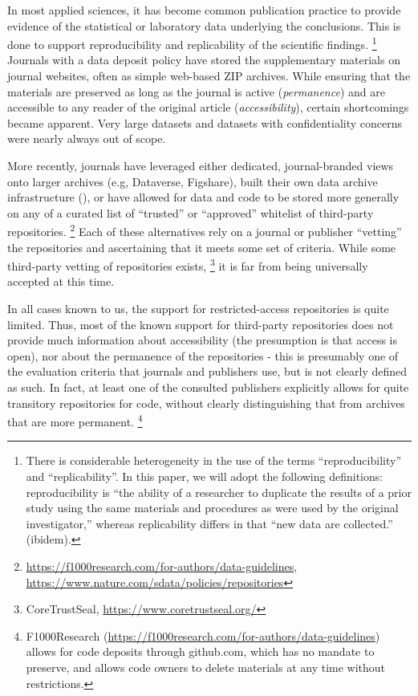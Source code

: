 In most applied sciences,
it has become common publication practice to provide evidence of the
statistical or laboratory data underlying the conclusions. This is done
to support reproducibility and replicability of the scientific
findings.%
\footnote{There is considerable heterogeneity in the use of the terms
	``reproducibility'' and ``replicability''. In this paper, we will adopt
	the following definitions: reproducibility is ``the ability of a
	researcher to duplicate the results of a prior study using the same
	materials and procedures as were used by the original investigator,''
	\parencite{BollenSocialBehavioralEconomic2015} whereas replicability
	differs in that ``new data are collected.'' (ibidem).} 
Journals with a
data deposit policy have stored the supplementary materials on journal
websites, often as simple web-based ZIP archives. While ensuring that
the materials are preserved as long as the journal is active
(\textit{permanence}) and are accessible to any reader of the original article (\textit{accessibility}), certain shortcomings became
apparent. Very large datasets and datasets with confidentiality concerns
were nearly always out of scope. 

More recently, journals have leveraged
either dedicated, journal-branded views onto larger archives (e.g,
Dataverse, Figshare), built their own data archive infrastructure
(), or have allowed for data and code to be stored
more generally on any of a curated list of ``trusted'' or ``approved''
whitelist of third-party repositories.%
\footnote{\url{https://f1000research.com/for-authors/data-guidelines}, \url{https://www.nature.com/sdata/policies/repositories}}
Each of these alternatives rely
on a journal or publisher ``vetting'' the repositories and ascertaining
that it meets some set of criteria.  While some third-party vetting of
repositories exists,%
\footnote{CoreTrustSeal, \url{https://www.coretrustseal.org/}}
it is far from being universally accepted at this
time. 

In all cases known to us, the support for restricted-access
repositories is quite limited. Thus, most of the known support for
third-party repositories does not provide much information about
accessibility (the presumption is that access is open), nor about the
permanence of the repositories - this is presumably one of the
evaluation criteria that journals and publishers use, but is not clearly
defined as such. In fact, at least one of the consulted publishers
explicitly allows for quite transitory repositories for code, without
clearly distinguishing that from archives that are more permanent.%
\footnote{F1000Research (\url{https://f1000research.com/for-authors/data-guidelines}) allows for code deposits through github.com, which has no mandate to preserve, and allows code owners to delete materials at any time without restrictions.}

